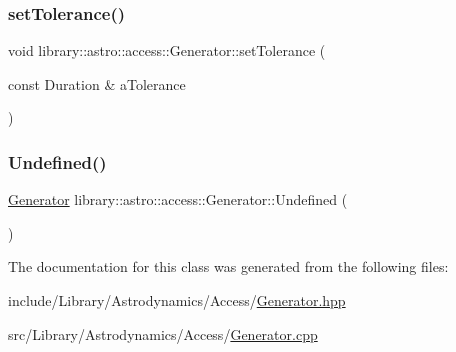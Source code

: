 \mbox{\label{classlibrary_1_1astro_1_1access_1_1_generator_ae4bc02fcd2edd6235745409996cd5bb6}} 
\subsubsection{\texorpdfstring{set\+Tolerance()}{setTolerance()}}
{\footnotesize\ttfamily void library\+::astro\+::access\+::\+Generator\+::set\+Tolerance (\begin{DoxyParamCaption}\item[{const Duration \&}]{a\+Tolerance }\end{DoxyParamCaption})}

\mbox{\label{classlibrary_1_1astro_1_1access_1_1_generator_a772aae06882c9c24c93978ec246bcc83}} 
\subsubsection{\texorpdfstring{Undefined()}{Undefined()}}
{\footnotesize\ttfamily \hyperlink{classlibrary_1_1astro_1_1access_1_1_generator}{Generator} library\+::astro\+::access\+::\+Generator\+::\+Undefined (\begin{DoxyParamCaption}{ }\end{DoxyParamCaption})\hspace{0.3cm}{\ttfamily [static]}}



The documentation for this class was generated from the following files\+:\begin{DoxyCompactItemize}
\item 
include/\+Library/\+Astrodynamics/\+Access/\hyperlink{_generator_8hpp}{Generator.\+hpp}\item 
src/\+Library/\+Astrodynamics/\+Access/\hyperlink{_generator_8cpp}{Generator.\+cpp}\end{DoxyCompactItemize}
